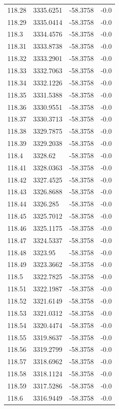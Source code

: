 \begin{table}[H]
\begin{tabular}{llll}
118.28 & 3335.6251 & -58.3758 & -0.0 \\
118.29 & 3335.0414 & -58.3758 & -0.0 \\
118.3 & 3334.4576 & -58.3758 & -0.0 \\
118.31 & 3333.8738 & -58.3758 & -0.0 \\
118.32 & 3333.2901 & -58.3758 & -0.0 \\
118.33 & 3332.7063 & -58.3758 & -0.0 \\
118.34 & 3332.1226 & -58.3758 & -0.0 \\
118.35 & 3331.5388 & -58.3758 & -0.0 \\
118.36 & 3330.9551 & -58.3758 & -0.0 \\
118.37 & 3330.3713 & -58.3758 & -0.0 \\
118.38 & 3329.7875 & -58.3758 & -0.0 \\
118.39 & 3329.2038 & -58.3758 & -0.0 \\
118.4 & 3328.62 & -58.3758 & -0.0 \\
118.41 & 3328.0363 & -58.3758 & -0.0 \\
118.42 & 3327.4525 & -58.3758 & -0.0 \\
118.43 & 3326.8688 & -58.3758 & -0.0 \\
118.44 & 3326.285 & -58.3758 & -0.0 \\
118.45 & 3325.7012 & -58.3758 & -0.0 \\
118.46 & 3325.1175 & -58.3758 & -0.0 \\
118.47 & 3324.5337 & -58.3758 & -0.0 \\
118.48 & 3323.95 & -58.3758 & -0.0 \\
118.49 & 3323.3662 & -58.3758 & -0.0 \\
118.5 & 3322.7825 & -58.3758 & -0.0 \\
118.51 & 3322.1987 & -58.3758 & -0.0 \\
118.52 & 3321.6149 & -58.3758 & -0.0 \\
118.53 & 3321.0312 & -58.3758 & -0.0 \\
118.54 & 3320.4474 & -58.3758 & -0.0 \\
118.55 & 3319.8637 & -58.3758 & -0.0 \\
118.56 & 3319.2799 & -58.3758 & -0.0 \\
118.57 & 3318.6962 & -58.3758 & -0.0 \\
118.58 & 3318.1124 & -58.3758 & -0.0 \\
118.59 & 3317.5286 & -58.3758 & -0.0 \\
118.6 & 3316.9449 & -58.3758 & -0.0 \\

\end{tabular}
\end{table}
